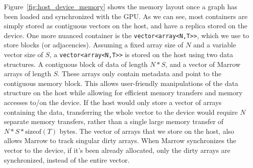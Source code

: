 Figure~\ref{fig:host_device_memory} shows the memory layout once a graph has been loaded and synchronized with the \gls{GPU}. As we can see, most containers are simply stored as contiguous vectors on the host, and have a replica stored on the device. One more nuanced container is the \texttt{vector<array<N,T>\!>}, which we use to store blocks (or adjacencies). Assuming a fixed array size of $N$ and a variable vector size of $S$, a \texttt{vector<array<N,T>\!>} is stored on the host using two data structures. A contiguous block of data of length $N*S$, and a vector of Marrow arrays of length $S$. These arrays only contain metadata and point to the contiguous memory block. This allows user-friendly manipulations of the data structure on the host while allowing for efficient memory transfers and memory accesses to/on the device. If the host would only store a vector of arrays containing the data, transferring the whole vector to the device would require $N$ separate memory transfers, rather than a single large memory transfer of $N*S* \text{sizeof} (T)$ bytes. The vector of arrays that we store on the host, also allows Marrow to track singular dirty arrays. When Marrow synchronizes the vector to the device, if it's been already allocated, only the dirty arrays are synchronized, instead of the entire vector.

